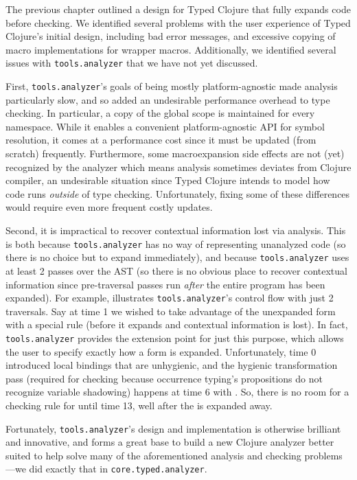 The previous chapter outlined a design for Typed Clojure that fully expands code
before checking.
We identified several problems with the user experience of Typed Clojure's initial design,
including bad error messages, and excessive copying of macro implementations for wrapper
macros.
Additionally, we identified several issues with \texttt{tools.analyzer} that we have
not yet discussed.

First, \texttt{tools.analyzer}'s goals of being mostly platform-agnostic made analysis particularly 
slow, and so added an undesirable performance overhead to type checking.
In particular, a copy of the
global scope is maintained for every namespace. While it enables a convenient platform-agnostic API
for symbol resolution,
it comes at a performance cost since it must be updated (from scratch) frequently.
Furthermore, some macroexpansion side effects are not (yet) recognized by the analyzer
which means analysis sometimes deviates from Clojure compiler, an undesirable situation
since Typed Clojure intends to model how code runs \emph{outside} of type checking.
Unfortunately, fixing some of these differences would require even more frequent costly updates.

Second, it is impractical to recover contextual information lost via analysis.
This is both because \texttt{tools.analyzer} has no way of representing unanalyzed
code (so there is no choice but to expand immediately), and
because \texttt{tools.analyzer} uses at least 2 passes over the AST
(so there is no obvious place to recover contextual information since pre-traversal
passes run \emph{after} the entire program has been expanded).
For example, 
illustrates \texttt{tools.analyzer}'s control flow with just 2 traversals.
Say at time 1 we wished to take advantage of the unexpanded 
form with a special rule (before it expands and contextual information is lost).
In fact, \texttt{tools.analyzer} provides the extension point 
for just this purpose, which allows the user to specify exactly how a form is expanded.
Unfortunately, time 0 introduced local bindings that are unhygienic, and the hygienic
transformation pass (required for checking because occurrence typing's propositions do not recognize variable shadowing)
happens at time 6 with .
So, there is no room for a checking rule for  until time 13, well
after the  is expanded away.

Fortunately, \texttt{tools.analyzer}'s design and implementation
is otherwise brilliant and innovative, and forms a great base to build a new Clojure analyzer better suited to help solve
many of the aforementioned analysis and checking problems---we did exactly that in \texttt{core.typed.analyzer}.

